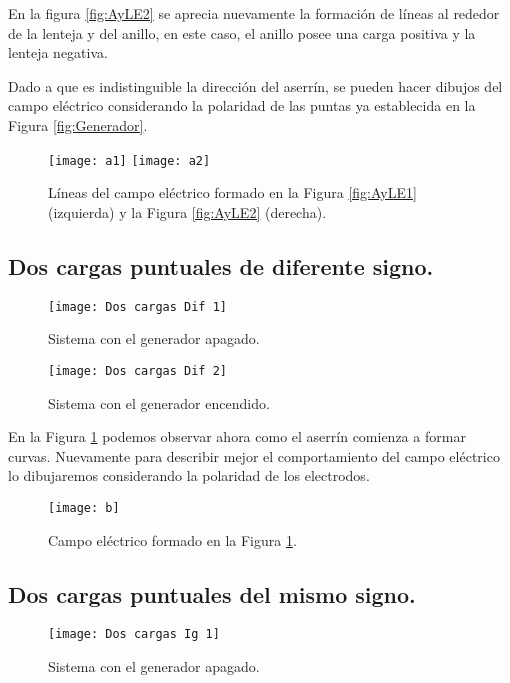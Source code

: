 \documentclass[14pt]{article}
\begin{document}
En la figura \ref{fig:AyLE2} se aprecia nuevamente la formación de líneas al rededor de la lenteja y del anillo, en este caso, el anillo posee una carga positiva y la lenteja negativa. 

Dado a que es indistinguible la dirección del aserrín, se pueden hacer dibujos del campo eléctrico considerando la polaridad de las puntas ya establecida en la Figura \ref{fig:Generador}.

\begin{figure}[h!]
	\centering
	\texttt{[image: a1]}
	\texttt{[image: a2]}
	\caption{Líneas del campo eléctrico formado en la Figura \ref{fig:AyLE1} (izquierda) y la Figura \ref{fig:AyLE2} (derecha).}
\end{figure}


\subsection{Dos cargas puntuales de diferente signo.}

\begin{figure}[h!]
	\centering
	\texttt{[image: Dos cargas Dif 1]}
	\caption{Sistema con el generador apagado.}
\end{figure}

\begin{figure}[h!]
	\centering
	\texttt{[image: Dos cargas Dif 2]}
	\caption{Sistema con el generador encendido.}
	\label{fig:CDif1}
\end{figure}

En la Figura \ref{fig:CDif1} podemos observar ahora como el aserrín comienza a formar curvas. Nuevamente para describir mejor el comportamiento del campo eléctrico lo dibujaremos considerando la polaridad de los electrodos.

\begin{figure}[h!]
	\centering
	\texttt{[image: b]}
	\caption{Campo eléctrico formado en la Figura \ref{fig:CDif1}.}
	
\end{figure}


\subsection{Dos cargas puntuales del mismo signo.}

\begin{figure}[h!]
	\centering
	\texttt{[image: Dos cargas Ig 1]}
	\caption{Sistema con el generador apagado.}
	\label{fig:2CarIA}
\end{figure}
\end{document}
